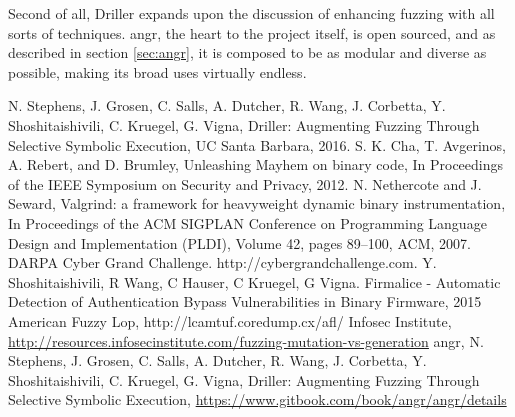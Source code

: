 \documentclass[a4paper]{article}
\begin{document}
Second of all, Driller expands upon the discussion of enhancing fuzzing with all sorts of techniques. angr, the heart to the project itself, is open sourced, and as described in section \ref{sec:angr}, it is composed to be as modular and diverse as possible, making its broad uses virtually endless. 
\newpage
\begin{thebibliography}{20}
	N. Stephens, J. Grosen, C. Salls, A. Dutcher, R. Wang, J. Corbetta, Y. Shoshitaishivili, C. Kruegel, G.  Vigna,
	Driller: Augmenting Fuzzing Through Selective Symbolic Execution,
	UC Santa Barbara,
	2016.
	S. K. Cha, T. Avgerinos, A. Rebert, and D. Brumley,
	Unleashing Mayhem on binary code,
	In Proceedings of the IEEE Symposium on Security and Privacy,
	2012.
	N. Nethercote and J. Seward,
	Valgrind: a framework for heavyweight dynamic binary instrumentation, 
	In Proceedings of the ACM SIGPLAN Conference on Programming Language Design and Implementation (PLDI),
	Volume 42,
	pages 89–100, 
	ACM,
	2007.
	DARPA Cyber Grand Challenge. http://cybergrandchallenge.com.
	Y. Shoshitaishivili, R Wang, C Hauser, C Kruegel, G Vigna.
	Firmalice - Automatic Detection of Authentication Bypass Vulnerabilities in Binary Firmware,
	2015
	American Fuzzy Lop,
	http://lcamtuf.coredump.cx/afl/
	Infosec Institute,
	\url{http://resources.infosecinstitute.com/fuzzing-mutation-vs-generation}
	angr,
	N. Stephens, J. Grosen, C. Salls, A. Dutcher, R. Wang, J. Corbetta, Y. Shoshitaishivili, C. Kruegel, G.  Vigna,
	Driller: Augmenting Fuzzing Through Selective Symbolic Execution,
	\url{https://www.gitbook.com/book/angr/angr/details}
\end{thebibliography}
\newpage
\end{document}
